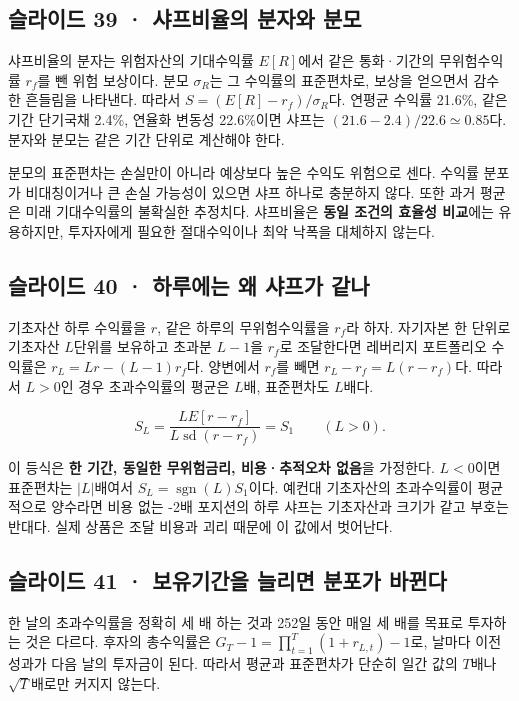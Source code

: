 \documentclass[11pt,a4paper]{article}
\begin{document}
\subsection{슬라이드 39 · 샤프비율의 분자와 분모}
샤프비율의 분자는 위험자산의 기대수익률 $E[R]$에서 같은 통화·기간의 무위험수익률 $r_f$를 뺀 위험 보상이다. 분모 $\sigma_R$는 그 수익률의 표준편차로, 보상을 얻으면서 감수한 흔들림을 나타낸다. 따라서 $S=(E[R]-r_f)/\sigma_R$다. 연평균 수익률 21.6\%, 같은 기간 단기국채 2.4\%, 연율화 변동성 22.6\%이면 샤프는 $(21.6-2.4)/22.6\simeq0.85$다. 분자와 분모는 같은 기간 단위로 계산해야 한다.\par

분모의 표준편차는 손실만이 아니라 예상보다 높은 수익도 위험으로 센다. 수익률 분포가 비대칭이거나 큰 손실 가능성이 있으면 샤프 하나로 충분하지 않다. 또한 과거 평균은 미래 기대수익률의 불확실한 추정치다. 샤프비율은 \textbf{동일 조건의 효율성 비교}에는 유용하지만, 투자자에게 필요한 절대수익이나 최악 낙폭을 대체하지 않는다.\par

\subsection{슬라이드 40 · 하루에는 왜 샤프가 같나}
기초자산 하루 수익률을 $r$, 같은 하루의 무위험수익률을 $r_f$라 하자. 자기자본 한 단위로 기초자산 $L$단위를 보유하고 초과분 $L-1$을 $r_f$로 조달한다면 레버리지 포트폴리오 수익률은 $r_L=Lr-(L-1)r_f$다. 양변에서 $r_f$를 빼면 $r_L-r_f=L(r-r_f)$다. 따라서 $L>0$인 경우 초과수익률의 평균은 $L$배, 표준편차도 $L$배다.\par

\[
S_L=\frac{L E[r-r_f]}{L\operatorname{sd}(r-r_f)}=S_1\qquad(L>0).
\]

이 등식은 \textbf{한 기간, 동일한 무위험금리, 비용·추적오차 없음}을 가정한다. $L<0$이면 표준편차는 $|L|$배여서 $S_L=\operatorname{sgn}(L)S_1$이다. 예컨대 기초자산의 초과수익률이 평균적으로 양수라면 비용 없는 -2배 포지션의 하루 샤프는 기초자산과 크기가 같고 부호는 반대다. 실제 상품은 조달 비용과 괴리 때문에 이 값에서 벗어난다.\par

\subsection{슬라이드 41 · 보유기간을 늘리면 분포가 바뀐다}
한 날의 초과수익률을 정확히 세 배 하는 것과 252일 동안 매일 세 배를 목표로 투자하는 것은 다르다. 후자의 총수익률은 $G_T-1=\prod_{t=1}^T(1+r_{L,t})-1$로, 날마다 이전 성과가 다음 날의 투자금이 된다. 따라서 평균과 표준편차가 단순히 일간 값의 $T$배나 $\sqrt{T}$배로만 커지지 않는다.\par
\end{document}
